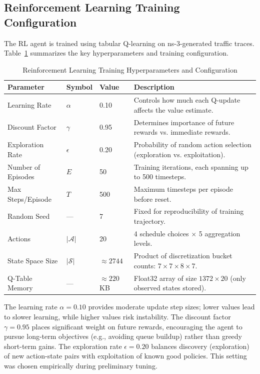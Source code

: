\documentclass[pdflatex,sn-mathphys-num]{sn-jnl}%
\theoremstyle{thmstyleone}%
\theoremstyle{thmstyletwo}%
\theoremstyle{thmstylethree}%
\begin{document}
\subsection{ Reinforcement Learning Training Configuration }
The RL agent is trained using tabular Q-learning on ns-3-generated traffic traces. Table~\ref{tab:rl_hyperparameters} summarizes the key hyperparameters and training configuration.

\begin{table}[h]
\centering
\small
\begin{tabular}{|l|l|l|p{4.5cm}|}\hline
\textbf{Parameter} & \textbf{Symbol} & \textbf{Value} & \textbf{Description} \\ \hline
Learning Rate & $\alpha$ & 0.10 & Controls how much each Q-update affects the value estimate. \\ \hline
Discount Factor & $\gamma$ & 0.95 & Determines importance of future rewards vs. immediate rewards. \\ \hline
Exploration Rate & $\epsilon$ & 0.20 & Probability of random action selection (exploration vs. exploitation). \\ \hline
Number of Episodes & $E$ & 50 & Training iterations, each spanning up to 500 timesteps. \\ \hline
Max Steps/Episode & $T$ & 500 & Maximum timesteps per episode before reset. \\ \hline
Random Seed & — & 7 & Fixed for reproducibility of training trajectory. \\ \hline
Actions & $|\mathcal{A}|$ & 20 & 4 schedule choices $\times$ 5 aggregation levels. \\ \hline
State Space Size & $|\mathcal{S}|$ & $\approx 2744$ & Product of discretization bucket counts: $7 \times 7 \times 8 \times 7$. \\ \hline
Q-Table Memory & — & $\approx 220$ KB & Float32 array of size $1372 \times 20$ (only observed states stored). \\ \hline
\end{tabular}
\caption{Reinforcement Learning Training Hyperparameters and Configuration}
\label{tab:rl_hyperparameters}
\end{table}

The learning rate $\alpha = 0.10$ provides moderate update step sizes; lower values lead to slower learning, while higher values risk instability. The discount factor $\gamma = 0.95$ places significant weight on future rewards, encouraging the agent to pursue long-term objectives (e.g., avoiding queue buildup) rather than greedy short-term gains. The exploration rate $\epsilon = 0.20$ balances discovery (exploration) of new action-state pairs with exploitation of known good policies. This setting was chosen empirically during preliminary tuning.
\end{document}
